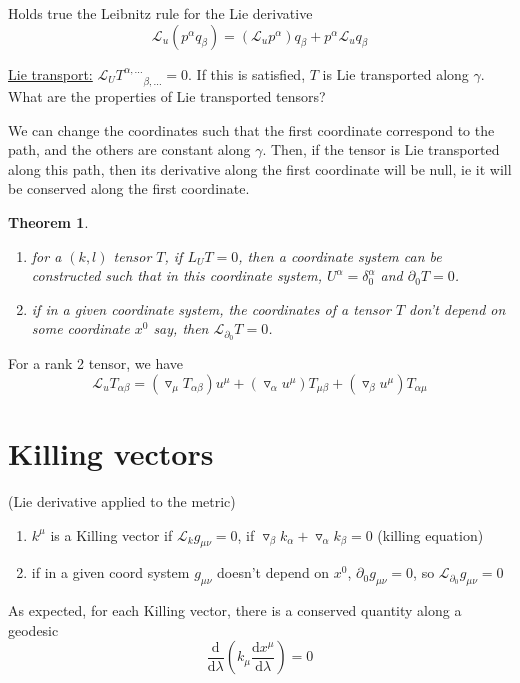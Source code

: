 \documentclass[a4paper]{book}
\newtheorem{theorem}{Theorem}[section]
\theoremstyle{definition}
\theoremstyle{remark}
\begin{document}
Holds true the Leibnitz rule for the Lie derivative
\begin{equation}
    \mathcal{L}_u(p^\alpha q_\beta) = (\mathcal{L}_u p^\alpha)q_\beta + p^\alpha \mathcal{L}_u  q_\beta
\end{equation}

\underline{Lie transport:} $\mathcal{L}_U T^{\alpha, \dots}_{\qquad \beta, \dots} = 0$. If this is satisfied, $T$ is Lie transported along $\gamma$. What are the properties of Lie transported tensors? \par \medskip 

We can change the coordinates such that the first coordinate correspond to the path, and the others are constant along $\gamma$. Then, if the tensor is Lie transported along this path, then its derivative along the first coordinate will be null, ie it will be conserved along the first coordinate. 

\begin{theorem}
    \begin{enumerate}
        \item for a $(k, l)$ tensor $T$, if $L_U T = 0$, then a coordinate system can be constructed such that in this coordinate system, $U^\alpha = \delta^\alpha_0$ and $\partial_0 T= 0$.
        \item if in a given coordinate system, the coordinates of a tensor $T$ don't depend on some coordinate $x^0$ say, then $\mathcal{L}_{\partial_0} T= 0$.  
    \end{enumerate}
\end{theorem}
For a rank 2 tensor, we have
\begin{equation}
    \mathcal{L}_u T_{\alpha\beta} = (\triangledown_\mu T_{\alpha\beta})u^\mu + (\triangledown_\alpha u^\mu)T_{\mu\beta} + (\triangledown_\beta u^\mu)T_{\alpha\mu} 
\end{equation}

\section{Killing vectors} (Lie derivative applied to the metric)
\begin{enumerate}
    \item $k^\mu$ is a Killing vector if $\mathcal{L}_k g_{\mu\nu} = 0$, if $\triangledown _\beta k_\alpha + \triangledown _\alpha k_\beta = 0$ (killing equation)
    \item if in a given coord system $g_{\mu\nu}$ doesn't depend on $x^0$, $\partial_0 g_{\mu\nu} = 0$, so $\mathcal{L}_{\partial_0}g_{\mu\nu} = 0$
\end{enumerate}
As expected, for each Killing vector, there is a conserved quantity along a geodesic 
\begin{equation}
    \frac{\text{d}}{\text{d}\lambda}\left(k_\mu \frac{\text{d}x^\mu}{\text{d}\lambda}\right) = 0
\end{equation}
\end{document}
